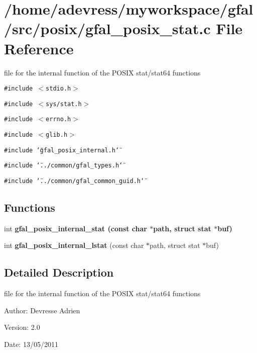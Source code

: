 \section{/home/adevress/myworkspace/gfal/src/posix/gfal\_\-posix\_\-stat.c File Reference}
\label{gfal__posix__stat_8c}
file for the internal function of the POSIX stat/stat64 functions 

{\tt \#include $<$stdio.h$>$}\par
{\tt \#include $<$sys/stat.h$>$}\par
{\tt \#include $<$errno.h$>$}\par
{\tt \#include $<$glib.h$>$}\par
{\tt \#include \char`\"{}gfal\_\-posix\_\-internal.h\char`\"{}}\par
{\tt \#include \char`\"{}../common/gfal\_\-types.h\char`\"{}}\par
{\tt \#include \char`\"{}../common/gfal\_\-common\_\-guid.h\char`\"{}}\par
\subsection*{Functions}
\begin{CompactItemize}
\item 
int \bf{gfal\_\-posix\_\-internal\_\-stat} (const char $\ast$path, struct stat $\ast$buf)
\item 
int \textbf{gfal\_\-posix\_\-internal\_\-lstat} (const char $\ast$path, struct stat $\ast$buf)\label{gfal__posix__stat_8c_ec4c6fc5e973e8fdb29bbff0a0fb096d}

\end{CompactItemize}


\subsection{Detailed Description}
file for the internal function of the POSIX stat/stat64 functions 

\begin{Desc}
\item[Author:]Devresse Adrien \end{Desc}
\begin{Desc}
\item[Version:]2.0 \end{Desc}
\begin{Desc}
\item[Date:]13/05/2011 \end{Desc}



